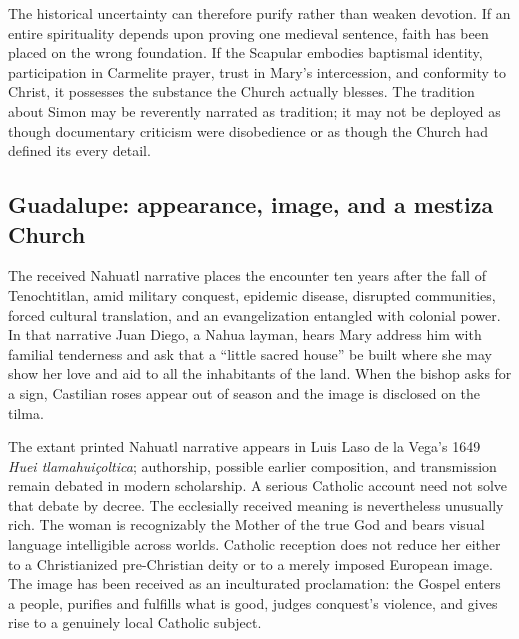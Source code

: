 The historical uncertainty can therefore purify rather than weaken devotion. If an entire spirituality depends upon proving one medieval sentence, faith has been placed on the wrong foundation. If the Scapular embodies baptismal identity, participation in Carmelite prayer, trust in Mary's intercession, and conformity to Christ, it possesses the substance the Church actually blesses. The tradition about Simon may be reverently narrated as tradition; it may not be deployed as though documentary criticism were disobedience or as though the Church had defined its every detail.

\subsection{Guadalupe: appearance, image, and a mestiza Church}


The received Nahuatl narrative places the encounter ten years after the fall of Tenochtitlan, amid military conquest, epidemic disease, disrupted communities, forced cultural translation, and an evangelization entangled with colonial power. In that narrative Juan Diego, a Nahua layman, hears Mary address him with familial tenderness and ask that a ``little sacred house'' be built where she may show her love and aid to all the inhabitants of the land. When the bishop asks for a sign, Castilian roses appear out of season and the image is disclosed on the tilma.

The extant printed Nahuatl narrative appears in Luis Laso de la Vega's 1649 \emph{Huei tlamahuiçoltica}; authorship, possible earlier composition, and transmission remain debated in modern scholarship. A serious Catholic account need not solve that debate by decree. The ecclesially received meaning is nevertheless unusually rich. The woman is recognizably the Mother of the true God and bears visual language intelligible across worlds. Catholic reception does not reduce her either to a Christianized pre-Christian deity or to a merely imposed European image. The image has been received as an inculturated proclamation: the Gospel enters a people, purifies and fulfills what is good, judges conquest's violence, and gives rise to a genuinely local Catholic subject.


